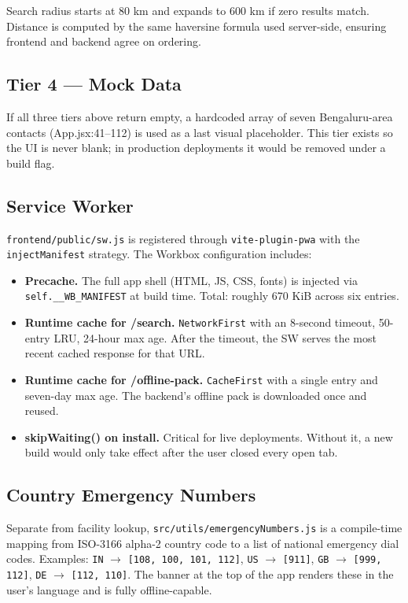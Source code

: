 \documentclass[11pt, a4paper]{article}
\newcommand{\file}[1]{\texttt{\small\color{rsblue}#1}}
\newcommand{\code}[1]{\texttt{\small#1}}
\begin{document}
Search radius starts at 80 km and expands to 600 km if zero results match. Distance is computed by the same haversine formula used server-side, ensuring frontend and backend agree on ordering.

\subsection{Tier 4 --- Mock Data}

If all three tiers above return empty, a hardcoded array of seven Bengaluru-area contacts (App.jsx:41--112) is used as a last visual placeholder. This tier exists so the UI is never blank; in production deployments it would be removed under a build flag.

\subsection{Service Worker}

\file{frontend/public/sw.js} is registered through \code{vite-plugin-pwa} with the \code{injectManifest} strategy. The Workbox configuration includes:

\begin{itemize}[leftmargin=*, itemsep=2pt, topsep=2pt]
  \item \textbf{Precache.} The full app shell (HTML, JS, CSS, fonts) is injected via \code{self.\_\_WB\_MANIFEST} at build time. Total: roughly 670 KiB across six entries.
  \item \textbf{Runtime cache for /search.} \code{NetworkFirst} with an 8-second timeout, 50-entry LRU, 24-hour max age. After the timeout, the SW serves the most recent cached response for that URL.
  \item \textbf{Runtime cache for /offline-pack.} \code{CacheFirst} with a single entry and seven-day max age. The backend's offline pack is downloaded once and reused.
  \item \textbf{skipWaiting() on install.} Critical for live deployments. Without it, a new build would only take effect after the user closed every open tab.
\end{itemize}

\subsection{Country Emergency Numbers}

Separate from facility lookup, \file{src/utils/emergencyNumbers.js} is a compile-time mapping from ISO-3166 alpha-2 country code to a list of national emergency dial codes. Examples: \code{IN} $\rightarrow$ \code{[108, 100, 101, 112]}, \code{US} $\rightarrow$ \code{[911]}, \code{GB} $\rightarrow$ \code{[999, 112]}, \code{DE} $\rightarrow$ \code{[112, 110]}. The banner at the top of the app renders these in the user's language and is fully offline-capable.
\end{document}
